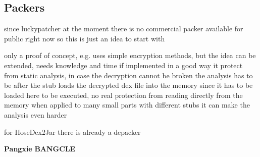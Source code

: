 \subsection{Packers}
\label{subsection:evaluation-reengineering-packers}
since luckypatcher 
at the moment there is no commercial packer available for public right now
so this is just an idea to start with

only a proof of concept, e.g. uses simple encryption methods, but the idea can be extended, needs knowledge and time
if implemented in a good way it protect from static analysis, in case the decryption cannot be broken the analysis has to be after the stub loads the decrypted dex file into the memory since it has to be loaded here to be executed, no real protection from reading directly from the memory
when applied to many small parts with different stubs it can make the analysis even harder

for HoseDex2Jar there is already a depacker \cite{githubDehoser}

\newline
\newline
\textbf{Pangxie} \newline
\newline
\newline
\textbf{BANGCLE} \newline
